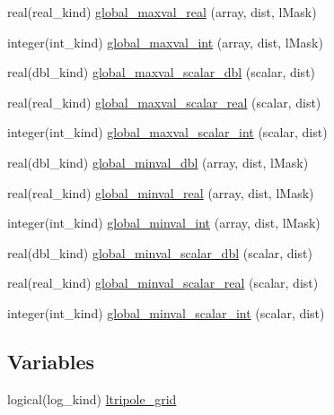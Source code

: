 \begin{DoxyCompactItemize}
\item 
real(real\_\-kind) \hyperlink{namespaceice__global__reductions_a85255323eef62fc17da07a4a61d89744}{global\_\-maxval\_\-real} (array, dist, lMask)
\item 
integer(int\_\-kind) \hyperlink{namespaceice__global__reductions_a09f454330678940b2277d70e4535290e}{global\_\-maxval\_\-int} (array, dist, lMask)
\item 
real(dbl\_\-kind) \hyperlink{namespaceice__global__reductions_a08a9bbce6bc2a8c8961009e0923ac274}{global\_\-maxval\_\-scalar\_\-dbl} (scalar, dist)
\item 
real(real\_\-kind) \hyperlink{namespaceice__global__reductions_a1f4cce7e3e8f22f0366ff60313a3e697}{global\_\-maxval\_\-scalar\_\-real} (scalar, dist)
\item 
integer(int\_\-kind) \hyperlink{namespaceice__global__reductions_aa1013da08de374f45ff86d6d2be77581}{global\_\-maxval\_\-scalar\_\-int} (scalar, dist)
\item 
real(dbl\_\-kind) \hyperlink{namespaceice__global__reductions_a7c09e90ceb0de6d5f40a525cabbc193a}{global\_\-minval\_\-dbl} (array, dist, lMask)
\item 
real(real\_\-kind) \hyperlink{namespaceice__global__reductions_a98165af03a1ac68b1a6114c63d9b7b11}{global\_\-minval\_\-real} (array, dist, lMask)
\item 
integer(int\_\-kind) \hyperlink{namespaceice__global__reductions_a6158397f98e574f0c587459b40db8d18}{global\_\-minval\_\-int} (array, dist, lMask)
\item 
real(dbl\_\-kind) \hyperlink{namespaceice__global__reductions_adf0dafd3b9b49b80c493ccf9f7fd7072}{global\_\-minval\_\-scalar\_\-dbl} (scalar, dist)
\item 
real(real\_\-kind) \hyperlink{namespaceice__global__reductions_a9bd28e27173eaf4c5a60841318b3d9f1}{global\_\-minval\_\-scalar\_\-real} (scalar, dist)
\item 
integer(int\_\-kind) \hyperlink{namespaceice__global__reductions_ab4a2ba94077b4e88fd24c9c1950026e3}{global\_\-minval\_\-scalar\_\-int} (scalar, dist)
\end{DoxyCompactItemize}
\subsection*{Variables}
\begin{DoxyCompactItemize}
\item 
logical(log\_\-kind) \hyperlink{namespaceice__global__reductions_a14140465b78c72f3b6923a37f4b8ea4c}{ltripole\_\-grid}
\end{DoxyCompactItemize}


